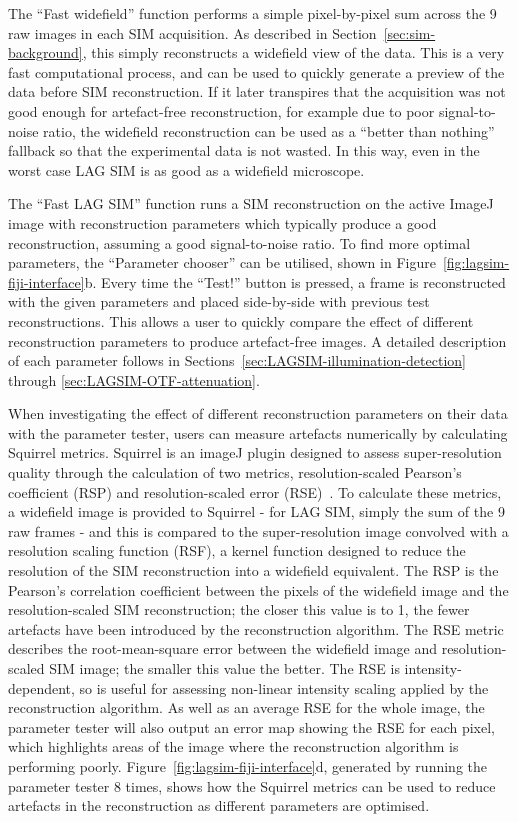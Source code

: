 The ``Fast widefield'' function performs a simple pixel-by-pixel sum across the 9 raw images in each SIM acquisition.
As described in Section~\ref{sec:sim-background}, this simply reconstructs a widefield view of the data.
This is a very fast computational process, and can be used to quickly generate a preview of the data before SIM reconstruction.
If it later transpires that the acquisition was not good enough for artefact-free reconstruction, for example due to poor signal-to-noise ratio, the widefield reconstruction can be used as a ``better than nothing'' fallback so that the experimental data is not wasted.
In this way, even in the worst case LAG SIM is as good as a widefield microscope.

The ``Fast LAG SIM'' function runs a SIM reconstruction on the active ImageJ image with reconstruction parameters which typically produce a good reconstruction, assuming a good signal-to-noise ratio.
To find more optimal parameters, the ``Parameter chooser'' can be utilised, shown in Figure~\ref{fig:lagsim-fiji-interface}b.
Every time the ``Test!'' button is pressed, a frame is reconstructed with the given parameters and placed side-by-side with previous test reconstructions.
This allows a user to quickly compare the effect of different reconstruction parameters to produce artefact-free images.
A detailed description of each parameter follows in Sections~\ref{sec:LAGSIM-illumination-detection} through \ref{sec:LAGSIM-OTF-attenuation}.

When investigating the effect of different reconstruction parameters on their data with the parameter tester, users can measure artefacts numerically by calculating Squirrel metrics. 
Squirrel is an imageJ plugin designed to assess super-resolution quality through the calculation of two metrics, resolution-scaled Pearson's coefficient (RSP) and resolution-scaled error (RSE)~\cite{culley2018quantitative}. 
To calculate these metrics, a widefield image is provided to Squirrel - for LAG SIM, simply the sum of the 9 raw frames - and this is compared to the super-resolution image convolved with a resolution scaling function (RSF), a kernel function designed to reduce the resolution of the SIM reconstruction into a widefield equivalent. 
The RSP is the Pearson's correlation coefficient between the pixels of the widefield image and the resolution-scaled SIM reconstruction; the closer this value is to 1, the fewer artefacts have been introduced by the reconstruction algorithm. 
The RSE metric describes the root-mean-square error between the widefield image and resolution-scaled SIM image; the smaller this value the better. 
The RSE is intensity-dependent, so is useful for assessing non-linear intensity scaling applied by the reconstruction algorithm.
As well as an average RSE for the whole image, the parameter tester will also output an error map showing the RSE for each pixel, which highlights areas of the image where the reconstruction algorithm is performing poorly. 
Figure~\ref{fig:lagsim-fiji-interface}d, generated by running the parameter tester 8 times, shows how the Squirrel metrics can be used to reduce artefacts in the reconstruction as different parameters are optimised. 


